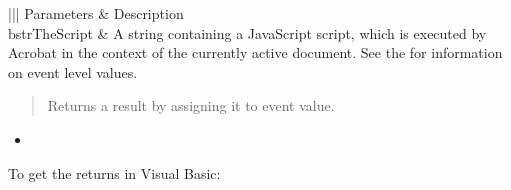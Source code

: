 \documentclass[letterpaper,12pt,english,openany,oneside]{sphinxmanual}
\begin{document}
\begin{savenotes}\sphinxattablestart
\centering
{}\label{\detokenize{IAC_API_FormsIntro:section-14}}\nobreak
\begin{tabular}[t]{|||}
\hline
\sphinxstyletheadfamily 
Parameters
&\sphinxstyletheadfamily 
Description
\\
\hline
bstrTheScript
&
A string containing a JavaScript script, which is executed by Acrobat in the context of the currently active document.   See the  for information on event level values.
\\
\hline
\end{tabular}
\par
\sphinxattableend\end{savenotes}
\label{\detokenize{IAC_API_FormsIntro:returns-4}}
\begin{quote}

Returns  a result by assigning it to event value.
\end{quote}
\label{\detokenize{IAC_API_FormsIntro:related-methods-9}}
\begin{itemize}
\item {} 

\end{itemize}
\label{\detokenize{IAC_API_FormsIntro:example-24}}

\begin{sphinxVerbatim}[commandchars=\\\{\}]
 
\end{sphinxVerbatim}

To get the returns in Visual Basic:

\begin{sphinxVerbatim}[commandchars=\\\{\}]
   
  
\end{sphinxVerbatim}
\end{document}
